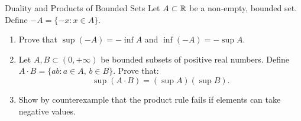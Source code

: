 \begin{exercise}{Duality and Products of Bounded Sets}
Let $A \subset \mathbb{R}$ be a non-empty, bounded set. Define $-A = \{-x : x \in A\}$.
\begin{enumerate}[leftmargin=1.5em,itemsep=2pt]
  \item Prove that $\sup(-A) = -\inf A$ and $\inf(-A) = -\sup A$.
  \item Let $A, B \subset (0, +\infty)$ be bounded subsets of positive real numbers.
  Define $A \cdot B = \{ab : a \in A,\, b \in B\}$. Prove that:
  \[
  \sup(A \cdot B) = (\sup A)(\sup B).
  \]
  \item Show by counterexample that the product rule fails if elements can take negative values.
\end{enumerate}
\end{exercise}

\begin{tabletworkspace}[5.0cm]
\end{tabletworkspace}

